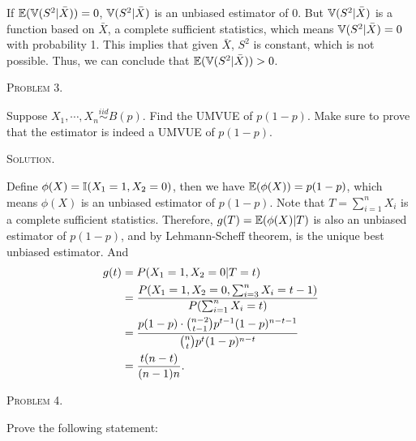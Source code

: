 \documentclass{article}
\begin{document}
\begin{CJK}{UTF8}{gbsn}
\begin{itemize}
              \noindent If ${\mathbb E}({\mathbb V}(S^2|\bar{X})) = 0$, ${\mathbb V}(S^2|\bar{X})$ is an unbiased estimator of 0. But
              ${\mathbb V}(S^2|\bar{X})$ is a function based on $\bar{X}$, a complete sufficient statistics, which means
              ${\mathbb V}(S^2|\bar{X}) = 0$ with probability 1. This implies that given $\bar{X}$, $S^2$ is constant, which is not possible.
              Thus, we can conclude that ${\mathbb E}({\mathbb V}(S^2|\bar{X})) > 0$.

    \end{itemize}


    \begin{shaded}
        \noindent\textsc{Problem 3.}\par
        Suppose $X_1, \cdots, X_n\mathop{\sim}\limits^{iid} B(p)$. Find the UMVUE of $p(1-p)$. Make
        sure to prove that the estimator is indeed a UMVUE of $p(1-p)$.
    \end{shaded}
    \noindent\textsc{Solution.}\par
    Define $\phi(X)={\mathbb I}(X_1=1, X_2=0)$, then we have ${\mathbb E}(\phi(X))=p(1-p)$, which means $\phi(X)$ is an unbiased
    estimator of $p(1-p)$. Note that $T=\sum_{i=1}^n X_i$ is a complete sufficient statistics. Therefore, $g(T) = {\mathbb E}(\phi(X)|T)$
    is also an unbiased estimator of $p(1-p)$, and by Lehmann-Scheff theorem, is the unique best unbiased estimator.
    And
    \begin{align}
        g(t) & =P(X_1=1, X_2=0 | T=t) \notag                                                                  \\
             & = \frac{P(X_1=1, X_2=0, \sum_{i=3}^n X_i = t-1)}{P(\sum_{i=1}^n X_i = t)} \notag               \\
             & = \frac{p(1-p) \cdot \binom{n-2}{t-1}p^{t-1}(1-p)^{n-t-1}}{\binom{n}{t}p^{t}(1-p)^{n-t}}\notag \\
             & = \frac{t(n-t)}{(n-1)n}.\notag
    \end{align}





    \begin{shaded}
        \noindent\textsc{Problem 4.}\par
        Prove the following statement:


\end{shaded}
\end{CJK}
\end{document}
